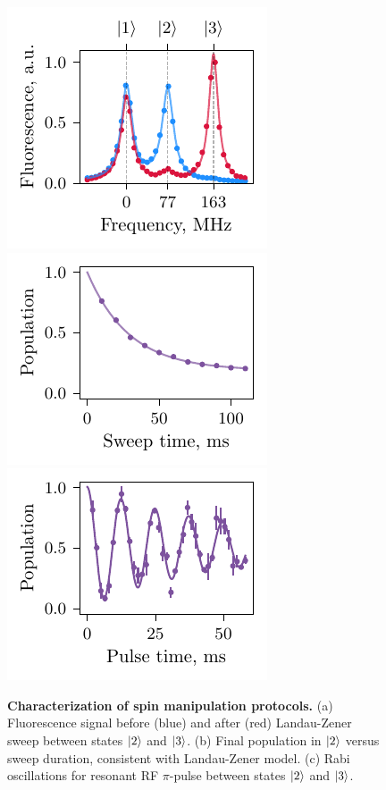 \begin{figure}
    \centering
    \includegraphics{fig-py/spin-flip-1.pdf}  \phantom{4}
    \includegraphics{fig-py/spin-flip-2.pdf}  \phantom{4}
    \includegraphics{fig-py/spin-flip-3.pdf}  \phantom{4}
    \caption[Characterization of spin manipulation protocols]{
        \textbf{Characterization of spin manipulation protocols.}
        (a) Fluorescence signal before (blue) and after (red) Landau-Zener sweep between states $\left| 2 \right\rangle$ and $\left| 3 \right\rangle$. 
        (b) Final population in $\left| 2 \right\rangle$ versus sweep duration, consistent with Landau-Zener model. 
        (c) Rabi oscillations for resonant RF $\pi$-pulse between states $\left| 2 \right\rangle$ and $\left| 3 \right\rangle$.
    }
    \label{fig:spin-flip}
\end{figure}

